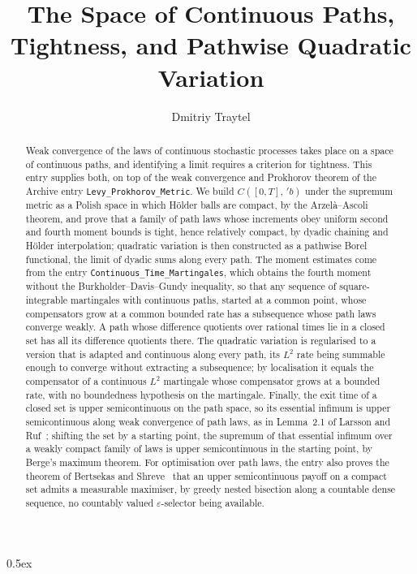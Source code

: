 \documentclass[11pt,a4paper]{article}
\begin{document}
\title{The Space of Continuous Paths, Tightness, and Pathwise Quadratic Variation}
\author{Dmitriy Traytel}
\maketitle

\begin{abstract}
  Weak convergence of the laws of continuous stochastic processes takes place
  on a space of continuous paths, and identifying a limit requires a
  criterion for tightness.  This entry supplies both, on top of the weak
  convergence and Prokhorov theorem of the Archive entry
  \texttt{Levy\_Prokhorov\_Metric}.  We build $C([0,T],\,'b)$ under the
  supremum metric as a Polish space in which H\"older balls are compact, by
  the Arzel\`a--Ascoli theorem, and
  prove that a family of path laws whose increments obey uniform second and
  fourth moment bounds is tight, hence relatively compact, by dyadic chaining
  and H\"older interpolation; quadratic variation is then constructed as a
  pathwise Borel functional, the limit of dyadic sums along every path.  The
  moment estimates come from the entry
  \texttt{Continuous\_Time\_Martingales}, which obtains the fourth moment
  without the Burkholder--Davis--Gundy inequality, so that any sequence of
  square-integrable martingales with continuous paths, started at a common
  point, whose compensators grow at a common bounded rate has a subsequence
  whose path laws converge weakly.
  A path whose difference quotients over rational times lie in a closed set
  has all its difference quotients there.
  The quadratic variation is regularised to a version that is adapted and
  continuous along every path, its $L^{2}$ rate being summable enough to
  converge without extracting a subsequence; by localisation it equals the
  compensator of a continuous $L^{2}$ martingale whose compensator grows at
  a bounded rate, with no boundedness hypothesis on the martingale.
  Finally, the exit time of a closed set is upper semicontinuous on the path
  space, so its essential infimum is upper semicontinuous along weak
  convergence of path laws, as in Lemma~2.1 of Larsson and
  Ruf~\cite{LarssonRuf}; shifting the set by a starting point, the supremum
  of that essential infimum over a weakly compact family of laws is upper
  semicontinuous in the starting point, by Berge's maximum theorem.
  For optimisation over path
  laws, the entry also proves the theorem of Bertsekas and
  Shreve~\cite{BertsekasShreve} that an upper semicontinuous payoff on a
  compact set admits a measurable maximiser, by greedy nested
  bisection along a countable dense sequence, no countably valued
  $\varepsilon$-selector being available.
\end{abstract}

\tableofcontents

\parindent 0pt\parskip 0.5ex





\end{document}
